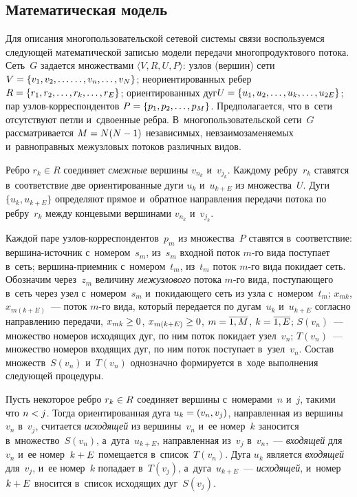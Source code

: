 \begin{multicols}{2}
\vspace*{-6pt}

\section{Математическая модель}

Для описания многопользовательской сетевой системы связи  воспользуемся следующей математической записью модели передачи многопродуктового потока.
Сеть~$G$ задается множествами  $\langle V, R,  U, P \rangle$:
узлов (вершин) сети  $V\hm = \{ v_1, v_2, \ldots\linebreak \ldots, v_n, \ldots, v_N \}$;
неориентированных ребер $R \hm= \{ r_1, r_2,  \ldots, r_k, \ldots, r_E \}$;
ориентированных дуг\linebreak  $U \hm= \{ u_1, u_2,  \ldots, u_k,  \ldots, u_{2E}\}$;
пар уз\-лов-кор\-рес\-пон\-ден\-тов $P\hm = \{ p_1, p_2,  \ldots, p_M\}$.
Предполагается, что в~сети отсутствуют петли и~сдвоенные ребра.
В~многопользовательской сети~$G$ рассматривается $M \hm= N (N\hm-1)$ независимых, невзаимозаменяемых и~равноправных межузловых потоков различных видов.

Ребро $r_k \in R$ соединяет \textit{смежные} вершины $v_{n_k}$ и~$v_{j_k}$.
Каждому ребру~$r_k$ ставятся в~соответствие две ориентированные дуги $u_k$ и~$u_{k+E}$ из множества~$U$.
Дуги $\{u_k, u_{k+E}\}$ определяют прямое и~обратное направления передачи потока по  ребру~$r_k$ между концевыми вершинами $v_{n_k}$  и~$v_{j_k}$.

Каждой паре уз\-лов-кор\-рес\-пон\-ден\-тов~$p_m$ из множества~$P$ ставятся в~соответствие:
вер\-ши\-на-ис\-точ\-ник с~номером~$s_m$,  из~$s_m$  входной поток $m$-го вида поступает в~сеть;
вер\-ши\-на-при\-емн\-ик с~номером~${t_m}$, из~${t_m}$ поток $m$-го вида покидает сеть.
Обозначим через~$z_m$ величину \textit{межузлового} потока $m$-го вида, поступающего в~сеть через узел с~номером~$s_m$ 
и~по\-ки\-да\-юще\-го сеть из узла с~номером~$t_m$;
$x_{mk}$, $x_{m(k + E)}$~---  поток $m$-го вида, который передается по дугам~$u_k$ и~$u_{k + E}$
 согласно направлению передачи, $x_{mk}\hm \ge 0$, $x_{m(k + E)}\hm\ge 0$, $m \hm= \ol{1, M}$, $k \hm= \ol {1, E}$;
$S(v_n)$~--- множество номеров исходящих дуг, по ним поток покидает узел~$v_n$;
$T(v_n)$~--- множество номеров входящих дуг, по ним поток поступает в~узел~$v_n$.
Состав множеств~$S(v_n)$  и~$T(v_n)$ однозначно формируется в~ходе выполнения следующей процедуры. 

Пусть некоторое ребро $r_k \hm\in R$ 
соединяет вершины с~номерами~$n$ и~$j$, такими что $n \hm< j$. Тогда ориентированная дуга $u_k\hm = (v_n, v_j)$, 
направленная из вершины~$v_n$ в~$v_j$, считается \textit{исходящей} из вершины~$v_{n}$ и~ее номер~$k$ заносится в~множество~$S(v_n)$, 
а~дуга~$u_{k+E}$, направленная из~$v_j$ в~$v_n$,~--- \textit{входящей} для~$v_{n}$ и~ее номер~$k\hm+E$ помещается в~список~$T(v_n)$.
Дуга $u_k$ является \textit{входящей} для~$v_j$, и~ее номер~$k$ попадает в~$T(v_j)$, а~дуга~$u_{k+E}$~--- \textit{исходящей}, и~номер $k\hm+E$ 
вносится в~список исходящих дуг~$S(v_j)$.


\end{multicols}
